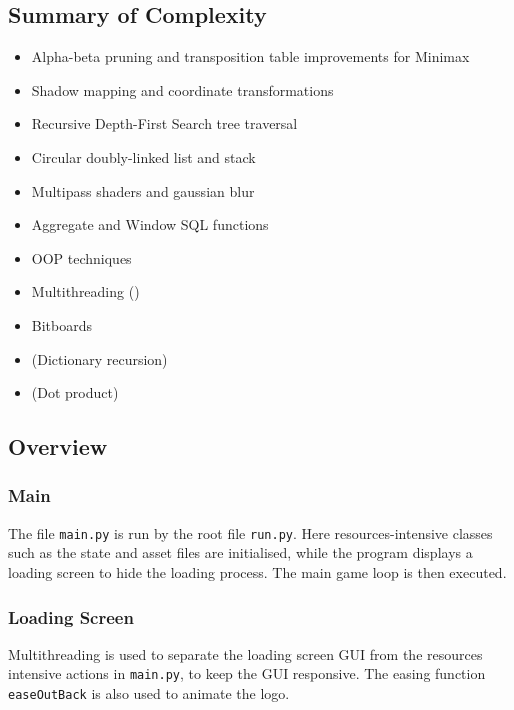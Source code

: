 \documentclass[../main/main.tex]{subfiles}
\begin{document}
\subsection{Summary of Complexity}
\begin{itemize}
\item Alpha-beta pruning and transposition table improvements for Minimax
\item Shadow mapping and coordinate transformations
\item Recursive Depth-First Search tree traversal
\item Circular doubly-linked list and stack
\item Multipass shaders and gaussian blur
\item Aggregate and Window SQL functions
\item OOP techniques
\item Multithreading ()
\item Bitboards
\item (Dictionary recursion)
\item (Dot product)
\end{itemize}

\subsection{Overview}

\subsubsection{Main}
The file \lstinline{main.py} is run by the root file \lstinline{run.py}. Here resources-intensive classes such as the state and asset files are initialised, while the program displays a loading screen to hide the loading process. The main game loop is then executed.


\subsubsection{Loading Screen}
\label{sec:loading_screen}
Multithreading is used to separate the loading screen GUI from the resources intensive actions in \lstinline{main.py}, to keep the GUI responsive. The easing function \lstinline{easeOutBack} is also used to animate the logo.

\end{document}
